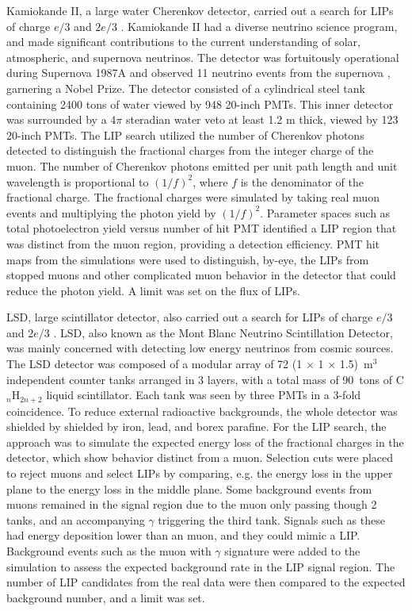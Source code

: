 Kamiokande II, a large water Cherenkov detector, carried out a search for \ac{LIP}s of charge $e/3$ and $2e/3$ \cite{Mori1991}. Kamiokande II had a diverse neutrino science program, and made significant contributions to the current understanding of solar, atmospheric, and supernova neutrinos. The detector was fortuitously operational during Supernova 1987A and observed 11 neutrino events from the supernova \cite{Hirata1988}, garnering a Nobel Prize. The detector consisted of a cylindrical steel tank containing 2400 tons of water viewed by 948 20-inch \ac{PMT}s. This inner detector was surrounded by a 4$\pi$ steradian water veto at least 1.2 m thick, viewed by 123 20-inch \ac{PMT}s. The \ac{LIP} search utilized the number of Cherenkov photons detected to distinguish the fractional charges from the integer charge of the muon.  The number of Cherenkov photons emitted per unit path length and unit wavelength is proportional to $(1/f)^{2}$, where $f$ is the denominator of the fractional charge. The fractional charges were simulated by taking real muon events and multiplying the photon yield by $(1/f)^{2}$. Parameter spaces such as total photoelectron yield versus number of hit \ac{PMT} identified a \ac{LIP} region that was distinct from the muon region, providing a detection efficiency. \ac{PMT} hit maps from the simulations were used to distinguish, by-eye, the \ac{LIP}s from stopped muons and other complicated muon behavior in the detector that could reduce the photon yield. A limit was set on the flux of \ac{LIP}s.

LSD, large scintillator detector, also carried out a search for \ac{LIP}s of charge $e/3$ and $2e/3$  \cite{Aglietta1994}. LSD, also known as the Mont Blanc Neutrino Scintillation Detector, was mainly concerned with detecting low energy neutrinos from cosmic sources.  The LSD detector was composed of a modular array of 72 (1 $\times$ 1 $\times$ 1.5)~m$^{3}$ independent counter tanks arranged in 3 layers, with a total mass of 90~tons of C$_{n}$H$_{2n+2}$ liquid scintillator. Each tank was seen by three \ac{PMT}s in a 3-fold coincidence. To reduce external radioactive backgrounds, the whole detector was shielded by shielded by iron, lead, and borex parafine. For the \ac{LIP} search, the approach was to simulate the expected energy loss of the fractional charges in the detector, which show behavior distinct from a muon. Selection cuts were placed to reject muons and select \ac{LIP}s by comparing, e.g. the energy loss in the upper plane to the energy loss in the middle plane. Some background events from muons remained in the signal region due to the muon only passing though 2 tanks, and an accompanying $\gamma$ triggering the third tank. Signals such as these had energy deposition lower than an muon, and they could mimic a \ac{LIP}. Background events such as the muon with $\gamma$ signature were added to the simulation to assess the expected background rate in the \ac{LIP} signal region.  The number of \ac{LIP} candidates from the real data were then compared to the expected background number, and a limit was set.

